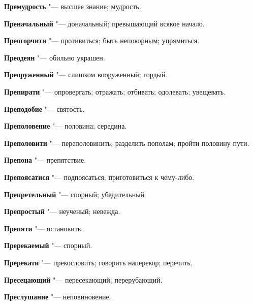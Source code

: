 \begin{mymulticols}{2}
\noindent\textbf{Премудрость} "--- высшее знание; мудрость. 




\noindent\textbf{Преначальный} "--- доначальный; превышающий всякое начало. 




\noindent\textbf{Преогорчити} "--- противиться; быть непокорным; упрямиться. 




\noindent\textbf{Преодеян} "--- обильно украшен. 




\noindent\textbf{Преоруженный} "--- слишком вооруженный; гордый. 




\noindent\textbf{Препирати} "--- опровергать; отражать; отбивать; одолевать; увещевать. 




\noindent\textbf{Преподобие} "--- святость. 




\noindent\textbf{Преполовение} "--- половина; середина. 




\noindent\textbf{Преполовити} "--- переполовинить; разделить пополам; пройти половину пути. 




\noindent\textbf{Препона} "--- препятствие. 




\noindent\textbf{Препоясатися} "--- подпоясаться; приготовиться к чему-либо. 




\noindent\textbf{Препретельный} "--- спорный; убедительный. 




\noindent\textbf{Препростый} "--- неученый; невежда. 




\noindent\textbf{Препяти} "--- остановить. 




\noindent\textbf{Пререкаемый} "--- спорный. 




\noindent\textbf{Пререкати} "--- прекословить; говорить наперекор; перечить. 




\noindent\textbf{Пресецающий} "--- пересекающий; перерубающий. 




\noindent\textbf{Преслушание} "--- неповиновение. 





\end{mymulticols}
